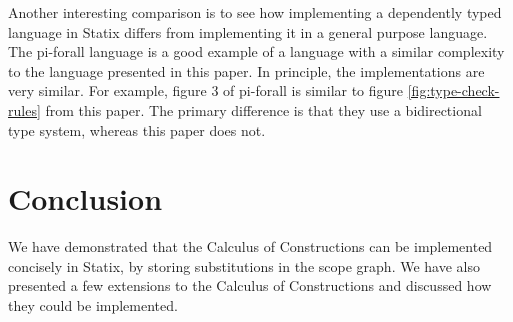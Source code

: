 \documentclass[a4paper,UKenglish,cleveref, autoref, thm-restate]{oasics-v2021}
\begin{document}
Another interesting comparison is to see how implementing a dependently typed language in Statix differs from implementing it in a general purpose language. The pi-forall language\cite{pi_forall} is a good example of a language with a similar complexity to the language presented in this paper. In principle, the implementations are very similar. For example, figure 3 of pi-forall is similar to figure \ref{fig:type-check-rules} from this paper. The primary difference is that they use a bidirectional type system, whereas this paper does not.

\section{Conclusion}

We have demonstrated that the Calculus of Constructions can be implemented concisely in Statix, by storing substitutions in the scope graph. We have also presented a few extensions to the Calculus of Constructions and discussed how they could be implemented.




\end{document}
